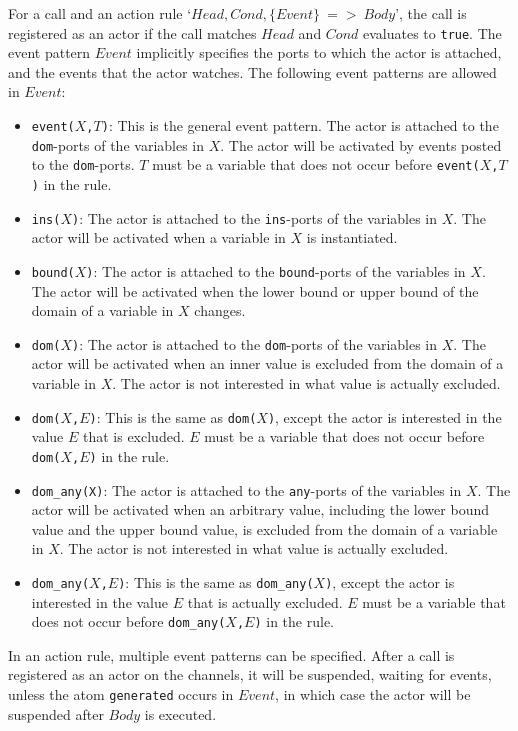 For a call and an action rule `$Head, Cond, \{Event\}\ $$=$$>$$\ Body$', the call is registered as an actor if the call matches $Head$ and $Cond$ evaluates to \texttt{true}. The event pattern $Event$ implicitly specifies the ports to which the actor is attached, and the events that the actor watches. The following event patterns are allowed in $Event$:
\begin{itemize}
\item \texttt{event($X$,$T$)}: This is the general event pattern. The actor is attached to the \texttt{dom}-ports of the variables in $X$.  The actor will be activated by events posted to the \texttt{dom}-ports. $T$ must be a variable that does not occur before \texttt{event($X$,$T$)} in the rule.
\item \texttt{ins($X$)}: The actor is attached to the \texttt{ins}-ports of the variables in $X$.  The actor will be activated when a variable in $X$ is instantiated.
\item \texttt{bound($X$)}: The actor is attached to the \texttt{bound}-ports of the variables in $X$.  The actor will be activated when the lower bound or upper bound of the domain of a variable in $X$ changes.
\item \texttt{dom($X$)}: The actor is attached to the \texttt{dom}-ports of the variables in $X$.  The actor will be activated when an inner value is excluded from the domain of a variable in $X$. The actor is not interested in what value is actually excluded.
\item \texttt{dom($X$,$E$)}: This is the same as \texttt{dom($X$)}, except the actor is interested in the value $E$ that is excluded. $E$ must be a variable that does not occur before \texttt{dom($X$,$E$)} in the rule.
\item \texttt{dom\_any(X)}: The actor is attached to the \texttt{any}-ports of the variables in $X$.  The actor will be activated when an arbitrary value, including the lower bound value and the upper bound value, is excluded from the domain of a variable in $X$.  The actor is not interested in what value is actually excluded. 
\item \texttt{dom\_any($X$,$E$)}: This is the same as \texttt{dom\_any($X$)}, except the actor is interested in the value $E$ that is actually excluded. $E$ must be a variable that does not occur before \texttt{dom\_any($X$,$E$)} in the rule.
\end{itemize}
In an action rule, multiple event patterns can be specified.  After a call is registered as an actor on the channels, it will be suspended, waiting for events, unless the atom \texttt{generated} occurs in $Event$, in which case the actor will be suspended after $Body$ is executed.


